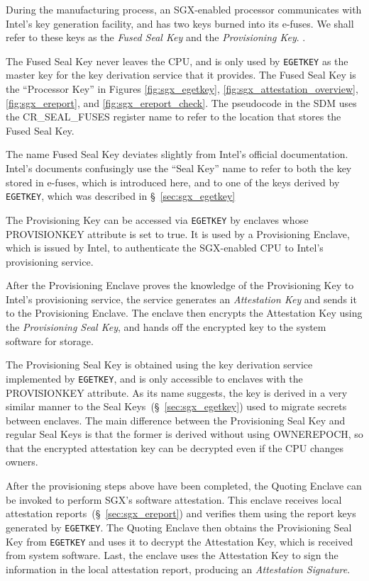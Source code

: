 During the manufacturing process, an SGX-enabled processor communicates with
Intel's key generation facility, and has two keys burned into its e-fuses. We
shall refer to these keys as the \textit{Fused Seal Key} and the
\textit{Provisioning Key}. .


The Fused Seal Key never leaves the CPU, and is only used by \texttt{EGETKEY}
as the master key for the key derivation service that it provides. The Fused
Seal Key is the ``Processor Key'' in Figures \ref{fig:sgx_egetkey},
\ref{fig:sgx_attestation_overview}, \ref{fig:sgx_ereport}, and
\ref{fig:sgx_ereport_check}. The pseudocode in the SDM uses the CR\_SEAL\_FUSES
register name to refer to the location that stores the Fused Seal Key.

The name Fused Seal Key deviates slightly from Intel's official documentation.
Intel's documents confusingly use the ``Seal Key'' name to refer to both the
key stored in e-fuses, which is introduced here, and to one of the keys derived
by \texttt{EGETKEY}, which was described in \S~\ref{sec:sgx_egetkey}

The Provisioning Key can be accessed via \texttt{EGETKEY} by enclaves whose
PROVISIONKEY attribute is set to true. It is used by a Provisioning Enclave,
which is issued by Intel, to authenticate the SGX-enabled CPU to Intel's
provisioning service.

After the Provisioning Enclave proves the knowledge of the Provisioning Key to
Intel's provisioning service, the service generates an \textit{Attestation Key}
and sends it to the Provisioning Enclave. The enclave then encrypts the
Attestation Key using the \textit{Provisioning Seal Key}, and hands off the
encrypted key to the system software for storage.

The Provisioning Seal Key is obtained using the key derivation service
implemented by \texttt{EGETKEY}, and is only accessible to enclaves with the
PROVISIONKEY attribute. As its name suggests, the key is derived in a very
similar manner to the Seal Keys~(\S~\ref{sec:sgx_egetkey}) used to migrate
secrets between enclaves. The main difference between the Provisioning Seal Key
and regular Seal Keys is that the former is derived without using OWNEREPOCH,
so that the encrypted attestation key can be decrypted even if the CPU changes
owners.

After the provisioning steps above have been completed, the Quoting Enclave can
be invoked to perform SGX's software attestation. This enclave receives local
attestation reports~(\S~\ref{sec:sgx_ereport}) and verifies them using the
report keys generated by \texttt{EGETKEY}. The Quoting Enclave then obtains
the Provisioning Seal Key from \texttt{EGETKEY} and uses it to decrypt the
Attestation Key, which is received from system software. Last, the enclave
uses the Attestation Key to sign the information in the local attestation
report, producing an \textit{Attestation Signature}.

